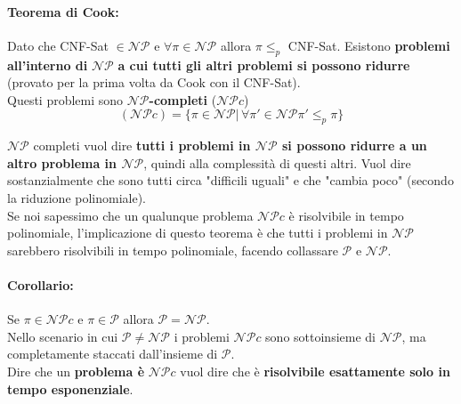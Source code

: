 \newpage

\paragraph{Teorema di Cook:} Dato che CNF-Sat $\in \mathcal{NP}$ e $\forall \pi \in \mathcal{NP}$ allora $\pi \leq_p$ CNF-Sat. Esistono \textbf{problemi all'interno di }$\mathcal{NP}$ \textbf{a cui tutti gli altri problemi si possono ridurre} (provato per la prima volta da Cook con il CNF-Sat).\\

Questi problemi sono \textbf{$\mathcal{NP}$-completi} ($\mathcal{NP}c$)
$$(\mathcal{NP}c) = \{\pi \in \mathcal{NP} | \, \forall \pi' \in \mathcal{NP} \pi' \leq_p \pi\} $$

$\mathcal{NP}$ completi vuol dire \textbf{tutti i problemi in $\mathcal{NP}$ si possono ridurre a un altro problema in $\mathcal{NP}$}, quindi alla complessità di questi altri. Vuol dire sostanzialmente che sono tutti circa "difficili uguali" e che "cambia poco" (secondo la riduzione polinomiale).\\

Se noi sapessimo che un qualunque problema $\mathcal{NP}c$ è risolvibile in tempo polinomiale, l'implicazione di questo teorema è che tutti i problemi in $\mathcal{NP}$ sarebbero risolvibili in tempo polinomiale, facendo collassare $\mathcal{P}$ e $\mathcal{NP}$.\\

\paragraph{Corollario:} Se $\pi \in \mathcal{NP}c$ e $\pi \in \mathcal{P}$ allora $\mathcal{P} = \mathcal{NP}$.\\

Nello scenario in cui $\mathcal{P} \neq \mathcal{NP}$ i problemi $\mathcal{NP}c$ sono sottoinsieme di $\mathcal{NP}$, ma completamente staccati dall'insieme di $\mathcal{P}$.\\

Dire che un \textbf{problema è} $\mathcal{NP}c$ vuol dire che è \textbf{risolvibile esattamente solo in tempo esponenziale}.\\

\newpage